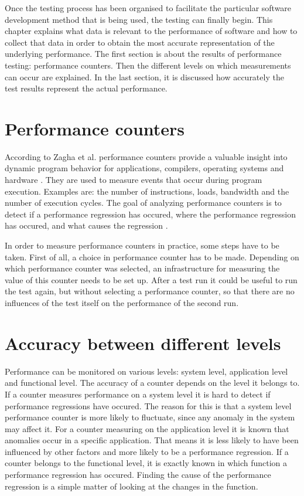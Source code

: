 Once the testing process has been organised to facilitate the particular software development method that is being used, the testing can finally begin. This chapter explains what data is relevant to the performance of software and how to collect that data in order to obtain the most accurate representation of the underlying performance. The first section is about the results of performance testing: performance counters. Then the different levels on which measurements can occur are explained. In the last section, it is discussed how accurately the test results represent the actual performance.

\section{Performance counters}
According to Zagha et al. performance counters provide a valuable insight into dynamic program behavior for applications, compilers, operating systems and hardware \cite{zagha1996performance}. They are used to measure events that occur during program execution. Examples are: the number of instructions, loads, bandwidth and the number of execution cycles. The goal of analyzing performance counters is to detect if a performance regression has occured, where the performance regression has occured, and what causes the regression \cite{nguyen2012using}.

In order to measure performance counters in practice, some steps have to be taken. First of all, a choice in performance counter has to be made. Depending on which performance counter was selected, an infrastructure for measuring the value of this counter needs to be set up. After a test run it could be useful to run the test again, but without selecting a performance counter, so that there are no influences of the test itself on the performance of the second run.

\section{Accuracy between different levels}
Performance can be monitored on various levels: system level, application level and functional level. The accuracy of a counter depends on the level it belongs to. If a counter measures performance on a system level it is hard to detect if performance regressions have occured. The reason for this is that a system level performance counter is more likely to fluctuate, since any anomaly in the system may affect it. For a counter measuring on the application level it is known that anomalies occur in a specific application. That means it is less likely to have been influenced by other factors and more likely to be a performance regression. If a counter belongs to the functional level, it is exactly known in which function a performance regression has occured. Finding the cause of the performance regression is a simple matter of looking at the changes in the function.


